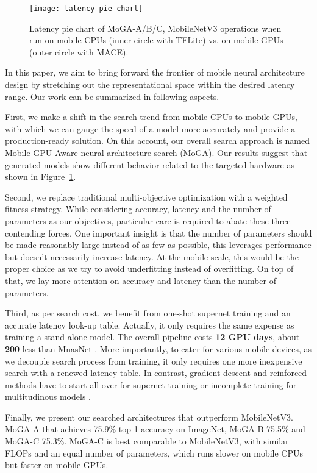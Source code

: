\documentclass[letterpaper]{article} \usepackage{aaai20}  \usepackage{times}  \usepackage{helvet} \usepackage{courier}  \usepackage[hyphens]{url}  \usepackage{graphicx} \urlstyle{rm} \def\UrlFont{\rm}  \usepackage{graphicx}  \usepackage{amsmath}
\begin{document}
\begin{figure}[ht]
\centering
{
\texttt{[image: latency-pie-chart]}
}
\caption{Latency pie chart of MoGA-A/B/C, MobileNetV3 operations when run on mobile CPUs (inner circle with TFLite) vs. on mobile GPUs (outer circle with MACE).}
\label{fig:pie-a-ops}
\end{figure}

In this paper, we aim to bring forward the frontier of mobile neural architecture design by stretching out the representational space within the desired latency range. Our work can be summarized in following aspects.

First, we make a shift in the search trend from mobile CPUs to mobile GPUs, with which we can gauge the speed of a model more accurately and provide a production-ready solution. On this account, our overall search approach is named Mobile GPU-Aware neural architecture search (MoGA). Our results suggest that generated models show different behavior related to the targeted hardware as shown in Figure~\ref{fig:pie-a-ops}. 

Second, we replace traditional multi-objective optimization with a weighted fitness strategy. While considering accuracy, latency and the number of parameters as our objectives, particular care is required to abate these three contending forces. One important insight is that the number of parameters should be made reasonably large instead of as few as possible, this leverages performance but doesn't necessarily increase latency. At the mobile scale, this would be the proper choice as we try to avoid underfitting instead of overfitting. On top of that, we lay more attention on accuracy and latency than the number of parameters. 

Third, as per search cost, we benefit from one-shot supernet training and an accurate latency look-up table. Actually, it only requires the same expense as training a stand-alone model. The overall pipeline costs \textbf{12 GPU days}, about \textbf{200} less than MnasNet \cite{tan2018mnasnet}. More importantly, to cater for various mobile devices, as we decouple search process from training, it only requires one more inexpensive search with a renewed latency table.  In contrast, gradient descent and reinforced methods have to start all over for supernet training or incomplete training for multitudinous models \cite{liu2018darts,tan2018mnasnet}.

Finally, we present our searched architectures that outperform MobileNetV3. MoGA-A that achieves 75.9\% top-1 accuracy on ImageNet, MoGA-B 75.5\% and MoGA-C 75.3\%. MoGA-C is best comparable to MobileNetV3, with similar FLOPs and an equal number of parameters, which runs slower on mobile CPUs but faster on mobile GPUs.
\end{document}
